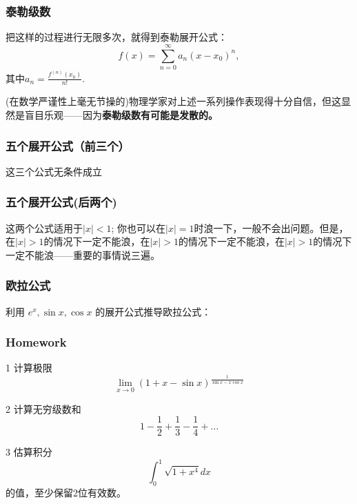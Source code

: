 \documentclass[CJK,13pt]{beamer}
\begin{document}
\begin{frame}
  \frametitle{泰勒级数}
  
  把这样的过程进行无限多次，就得到{\blue 泰勒展开公式：
  $$f(x) = \sum_{n=0}^\infty a_n(x-x_0)^n,$$
  其中$a_n = \frac{f^{(n)}(x_0)}{n!}$.}

  \skiplines

  (在数学严谨性上毫无节操的)物理学家对上述一系列操作表现得十分自信，但这显然是盲目乐观——因为{\bf 泰勒级数有可能是发散的。}
  
\end{frame}






\begin{frame}
  \frametitle{五个展开公式（前三个）}
  这三个公式无条件成立
\end{frame}


\begin{frame}
  \frametitle{五个展开公式(后两个)}
  这两个公式{\blue 适用于$|x|< 1$}; 你也可以在$|x|=1$时浪一下，一般不会出问题。但是，{\blue 在$|x|>1$的情况下一定不能浪，在$|x|>1$的情况下一定不能浪，在$|x|>1$的情况下一定不能浪}——重要的事情说三遍。
\end{frame}


\begin{frame}
  \frametitle{欧拉公式}
  利用 $e^x, \sin x, \cos x$ 的展开公式推导欧拉公式：

\end{frame}








\begin{frame}
  \frametitle{Homework}
  \bitem
\item[1]{计算极限 $$\lim_{x\rightarrow 0} (1+x-\sin x)^{\frac{1}{\sin x - x\cos x}} $$}
\item[2]{计算无穷级数和 $$1-\frac{1}{2}+\frac{1}{3}-\frac{1}{4}+\ldots $$}
\item[3]{估算积分  $$\int_0^1 \sqrt{1+x^4} dx $$ 的值，至少保留2位有效数。 }
  \eitem
\end{frame}

\ech
\end{document}
